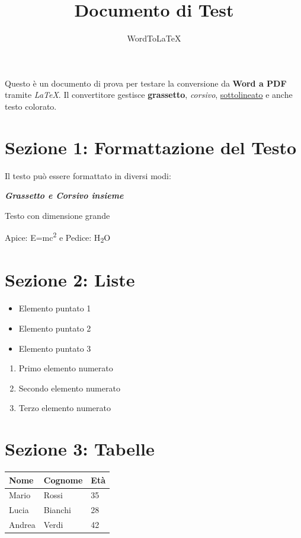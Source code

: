 \documentclass[11pt, a4paper]{article}
\begin{document}
\title{Documento di Test}
\author{WordToLaTeX}
\date{}
\maketitle
\thispagestyle{fancy}

Questo è un documento di prova per testare la conversione da \textbf{Word a PDF} tramite \textit{LaTeX}. Il convertitore gestisce \textbf{grassetto}, \textit{corsivo}, \underline{sottolineato} e anche \textcolor[RGB]{255,0,0}{testo colorato}.

\section{Sezione 1: Formattazione del Testo}

Il testo può essere formattato in diversi modi:

\textit{\textbf{Grassetto e Corsivo insieme}}

Testo con dimensione grande

Apice: E=mc\textsuperscript{2} e Pedice: H\textsubscript{2}O

\section{Sezione 2: Liste}

\begin{itemize}
  \item Elemento puntato 1
  \item Elemento puntato 2
  \item Elemento puntato 3
\end{itemize}

\begin{enumerate}
  \item Primo elemento numerato
  \item Secondo elemento numerato
  \item Terzo elemento numerato
\end{enumerate}

\section{Sezione 3: Tabelle}

\begin{table}[H]
  \centering
  \begin{tabularx}{\textwidth}{|X|X|X|}
    \hline
    \textbf{Nome} & \textbf{Cognome} & \textbf{Età} \\
    \hline
    Mario & Rossi & 35 \\
    \hline
    Lucia & Bianchi & 28 \\
    \hline
    Andrea & Verdi & 42 \\
    \hline
  \end{tabularx}
\end{table}
\end{document}
